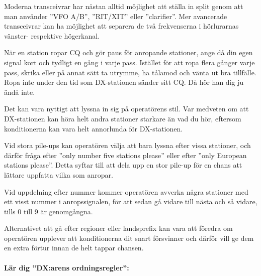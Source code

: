 Moderna transceivrar har nästan alltid möjlighet att ställa in split genom att
man använder ''VFO A/B'', ''RIT/XIT'' eller ''clarifier''.
Mer avancerade transceivrar kan ha möjlighet att separera de två frekvenserna i
hörlurarnas vänster- respektive högerkanal.

När en station ropar CQ och gör paus för anropande stationer, ange då din egen
signal kort och tydligt en gång i varje pass.
Istället för att ropa flera gånger varje pass, skrika eller på annat sätt
ta utrymme, ha tålamod och vänta ut bra tillfälle.
Ropa inte under den tid som DX-stationen sänder sitt CQ. Då hör han dig ju ändå inte.

Det kan vara nyttigt att lyssna in sig på operatörens stil.
Var medveten om att DX-stationen kan höra helt andra stationer starkare än vad
du hör, eftersom konditionerna kan vara helt annorlunda för DX-stationen.

Vid stora pile-ups kan operatören välja att bara lyssna efter vissa stationer,
och därför fråga efter ''only number five stations please'' eller efter ''only
European stations please''.
Detta syftar till att dela upp en stor pile-up för en chans att lättare
uppfatta vilka som anropar.

Vid uppdelning efter nummer kommer operatören avverka några stationer med ett
visst nummer i anropssignalen, för att sedan gå vidare till nästa och så
vidare, tills 0 till 9 är genomgångna.

Alternativet att gå efter regioner eller landsprefix kan vara att föredra om
operatören upplever att konditionerna dit snart försvinner och därför vill ge
dem en extra förtur innan de helt tappar chansen.

\paragraph{Lär dig ''DX:arens ordningsregler'':}

